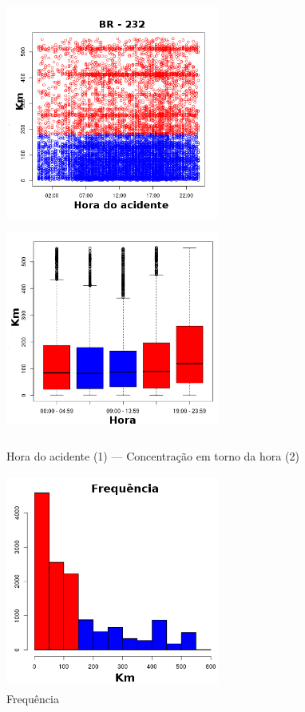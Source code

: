 \begin{figure}[h]
	\caption{Hora do acidente (1) --- Concentração em torno da hora (2)}
	\includegraphics[width=7cm,height=7cm]{Figuras/Preprocess/br232_1.png}
	\includegraphics[width=7cm,height=7cm]{Figuras/Preprocess/br232_2.png}

\end{figure}

\quad \quad
\begin{figure}[h]
	\centering
	\caption{ Frequência}
	\includegraphics[width=7cm,height=7cm]{Figuras/Preprocess/br232_3.png}
\end{figure}


